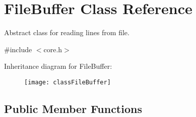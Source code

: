\hypertarget{classFileBuffer}{
\section{FileBuffer Class Reference}
\label{classFileBuffer}
}


Abstract class for reading lines from file.  




{\ttfamily \#include $<$core.h$>$}

Inheritance diagram for FileBuffer:\begin{figure}[H]
\begin{center}
\leavevmode
\texttt{[image: classFileBuffer]}
\end{center}
\end{figure}
\subsection*{Public Member Functions}
